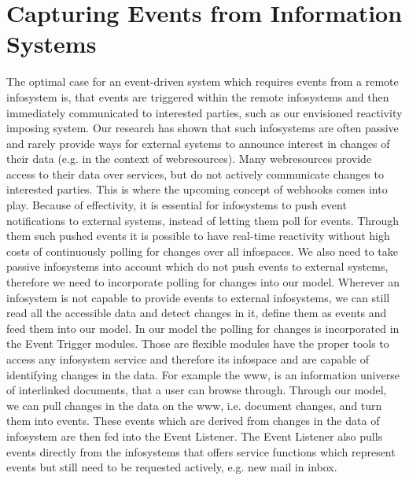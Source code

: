 \section{Capturing Events from Information Systems}
The optimal case for an event-driven system which requires events from a remote \textrm{\gls{infosystem}} is, that events are triggered within the remote \textrm{\glspl{infosystem}} and then immediately communicated to interested parties, such as our envisioned reactivity imposing system.
Our research has shown that such \textrm{\glspl{infosystem}} are often passive and rarely provide ways for external systems to announce interest in changes of their data (e.g. in the context of \textrm{\glspl{webresource}}).
Many \textrm{\glspl{webresource}} provide access to their data over services, but do not actively communicate changes to interested parties.
This is where the upcoming concept of \textrm{\glspl{webhook}} comes into play.
Because of effectivity, it is essential for \textrm{\glspl{infosystem}} to push event notifications to external systems, instead of letting them poll for events.
Through them such pushed events it is possible to have real-time reactivity without high costs of continuously polling for changes over all \textrm{\glspl{infospace}}.
We also need to take passive \textrm{\glspl{infosystem}} into account which do not push events to external systems, therefore we need to incorporate polling for changes into our model.
Wherever an \textrm{\gls{infosystem}} is not capable to provide events to external \textrm{\glspl{infosystem}}, we can still read all the accessible data and detect changes in it, define them as events and feed them into our model.
In our model the polling for changes is incorporated in the \textrm{Event Trigger} modules.
Those are flexible modules have the proper tools to access any \textrm{\gls{infosystem}} service and therefore its \textrm{\gls{infospace}} and are capable of identifying changes in the data.
For example the \textrm{\gls{www}}, is an information universe of interlinked documents, that a user can browse through.
Through our model, we can pull changes in the data on the \textrm{\gls{www}}, i.e. document changes, and turn them into events.
These events which are derived from changes in the data of \textrm{\gls{infosystem}} are then fed into the \textrm{Event Listener}.
The \textrm{Event Listener} also pulls events directly from the \textrm{\glspl{infosystem}} that offers service functions which represent events but still need to be requested actively, e.g. new mail in inbox.



